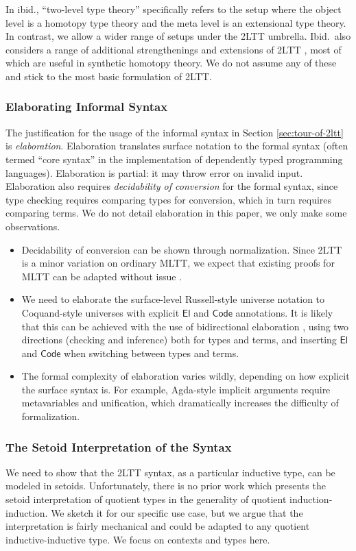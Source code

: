 \documentclass[acmsmall,screen]{acmart}
\newcommand{\msf}[1]{\mathsf{#1}}
\newcommand{\Code}{\msf{Code}}
\newcommand{\El}{\msf{El}}
\theoremstyle{remark}
\begin{document}
In ibid., ``two-level type theory'' specifically refers to the setup
where the object level is a homotopy type theory and the meta level is an
extensional type theory. In contrast, we allow a wider range of setups under the
2LTT umbrella. Ibid.\ also considers a range of additional
strengthenings and extensions of 2LTT \cite[Section~2.4]{twolevel}, most of which
are useful in synthetic homotopy theory. We do not assume any of these and
stick to the most basic formulation of 2LTT.

\subsubsection{Elaborating Informal Syntax}
The justification for the usage of the informal syntax in Section
\ref{sec:tour-of-2ltt} is \emph{elaboration}. Elaboration translates surface
notation to the formal syntax (often termed ``core syntax'' in the
implementation of dependently typed programming languages). Elaboration is
partial: it may throw error on invalid input. Elaboration also requires
\emph{decidability of conversion} for the formal syntax, since type checking
requires comparing types for conversion, which in turn requires comparing terms.
We do not detail elaboration in this paper, we only make some observations.
\begin{itemize}
\item Decidability of conversion can be shown through normalization. Since 2LTT
      is a minor variation on ordinary MLTT, we expect that existing proofs for MLTT
      can be adapted without issue \cite{coquand2018canonicity,decidableconv}.
\item We need to elaborate the surface-level Russell-style universe notation to
      Coquand-style universes with explicit $\El$ and $\Code$ annotations. It is
      likely that this can be achieved with the use of bidirectional elaboration
      \cite{DBLP:journals/csur/DunfieldK21}, using two directions (checking and
      inference) both for types and terms, and inserting $\El$ and $\Code$ when
      switching between types and terms.
\item The formal complexity of elaboration varies wildly, depending on how
      explicit the surface syntax is. For example, Agda-style implicit arguments
      require metavariables and unification, which dramatically increases the
      difficulty of formalization.
\end{itemize}

\subsubsection{The Setoid Interpretation of the Syntax}\label{sec:2lttsetoid} We need to show
that the 2LTT syntax, as a particular inductive type, can be modeled in setoids.
Unfortunately, there is no prior work which presents the setoid interpretation
of quotient types in the generality of quotient induction-induction. We sketch
it for our specific use case, but we argue that the interpretation is fairly
mechanical and could be adapted to any quotient inductive-inductive type.
We focus on contexts and types here.
\end{document}
